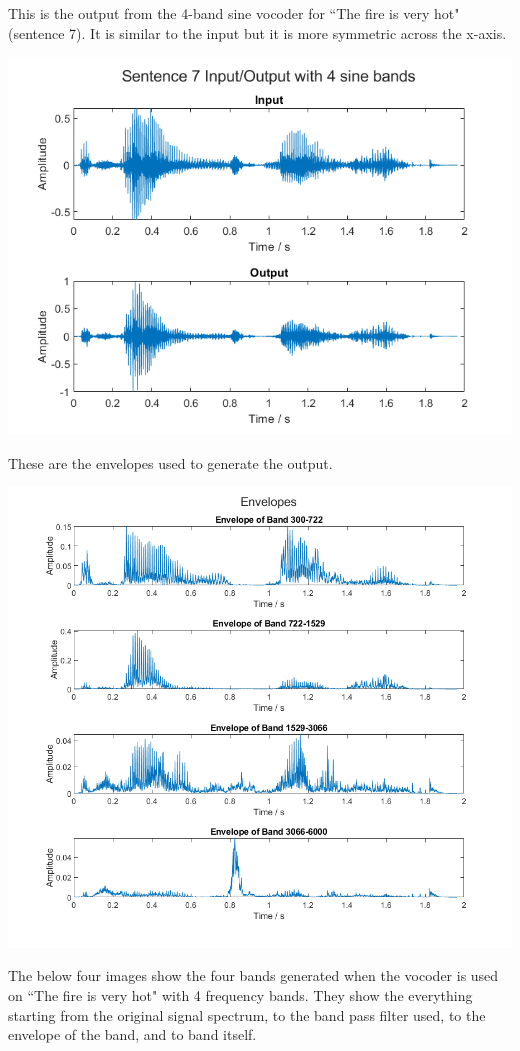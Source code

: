 \documentclass[11pt]{article}
\begin{document}
This is the output from the 4-band sine vocoder for ``The fire is very hot" (sentence 7).
It is similar to the input but it is more symmetric across the x-axis.

\includegraphics[height=0.3\textheight]{output/IO_4sine.png}

These are the envelopes used to generate the output.

\includegraphics[height=0.45\textheight]{output/sent007_envelopes.png}

The below four images show the four bands generated when the vocoder
is used on ``The fire is very hot" with 4 frequency bands.
They show the everything starting from the original signal 
spectrum, to the band pass filter used, to the envelope of the band,
and to band itself.
\end{document}
